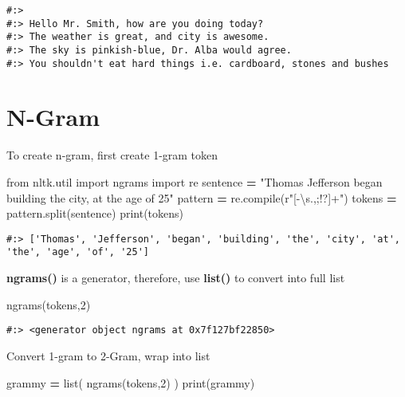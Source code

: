 \documentclass[
]{book}
\newenvironment{Shaded}{\begin{snugshade}}{\end{snugshade}}
\newcommand{\BuiltInTok}[1]{#1}
\newcommand{\DecValTok}[1]{\textcolor[rgb]{0.06,0.06,0.06}{#1}}
\newcommand{\ImportTok}[1]{#1}
\newcommand{\NormalTok}[1]{#1}
\newcommand{\OperatorTok}[1]{\textcolor[rgb]{0.43,0.43,0.43}{\textbf{#1}}}
\newcommand{\StringTok}[1]{\textcolor[rgb]{0.5,0.5,0.5}{#1}}
\newcommand{\VerbatimStringTok}[1]{\textcolor[rgb]{0.5,0.5,0.5}{#1}}
\begin{document}
\begin{verbatim}
#:> 
#:> Hello Mr. Smith, how are you doing today?
#:> The weather is great, and city is awesome.
#:> The sky is pinkish-blue, Dr. Alba would agree.
#:> You shouldn't eat hard things i.e. cardboard, stones and bushes
\end{verbatim}

\hypertarget{n-gram}{%
\section{N-Gram}\label{n-gram}}

To create n-gram, first create 1-gram token

\begin{Shaded}
\begin{Highlighting}[]
\ImportTok{from}\NormalTok{ nltk.util }\ImportTok{import}\NormalTok{ ngrams }
\ImportTok{import}\NormalTok{ re}
\NormalTok{sentence }\OperatorTok{=} \StringTok{"Thomas Jefferson began building the city, at the age of 25"}
\NormalTok{pattern }\OperatorTok{=}\NormalTok{ re.}\BuiltInTok{compile}\NormalTok{(}\VerbatimStringTok{r"[{-}\textbackslash{}s.,;!?]+"}\NormalTok{)}
\NormalTok{tokens }\OperatorTok{=}\NormalTok{ pattern.split(sentence)}
\BuiltInTok{print}\NormalTok{(tokens)}
\end{Highlighting}
\end{Shaded}

\begin{verbatim}
#:> ['Thomas', 'Jefferson', 'began', 'building', 'the', 'city', 'at', 'the', 'age', 'of', '25']
\end{verbatim}

\textbf{ngrams()} is a generator, therefore, use \textbf{list()} to convert into full list

\begin{Shaded}
\begin{Highlighting}[]
\NormalTok{ngrams(tokens,}\DecValTok{2}\NormalTok{)}
\end{Highlighting}
\end{Shaded}

\begin{verbatim}
#:> <generator object ngrams at 0x7f127bf22850>
\end{verbatim}

Convert 1-gram to 2-Gram, wrap into list

\begin{Shaded}
\begin{Highlighting}[]
\NormalTok{grammy }\OperatorTok{=} \BuiltInTok{list}\NormalTok{( ngrams(tokens,}\DecValTok{2}\NormalTok{) )}
\BuiltInTok{print}\NormalTok{(grammy)}
\end{Highlighting}
\end{Shaded}
\end{document}
